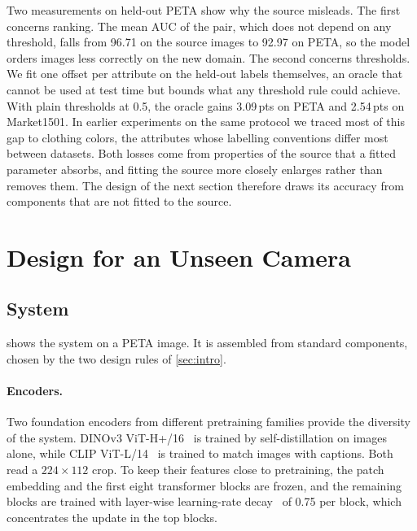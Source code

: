 \documentclass[10pt,twocolumn,letterpaper]{article}
\newcommand{\pts}{\,pts}
\begin{document}
Two measurements on held-out PETA show why the source misleads. The first concerns ranking. The mean AUC of the pair, which does not depend on any threshold, falls from 96.71 on the source images to 92.97 on PETA, so the model orders images less correctly on the new domain. The second concerns thresholds. We fit one offset per attribute on the held-out labels themselves, an oracle that cannot be used at test time but bounds what any threshold rule could achieve. With plain thresholds at 0.5, the oracle gains 3.09\pts{} on PETA and 2.54\pts{} on Market1501. In earlier experiments on the same protocol we traced most of this gap to clothing colors, the attributes whose labelling conventions differ most between datasets. Both losses come from properties of the source that a fitted parameter absorbs, and fitting the source more closely enlarges rather than removes them. The design of the next section therefore draws its accuracy from components that are not fitted to the source.

\section{Design for an Unseen Camera}
\label{sec:design}

\subsection{System}
\label{sec:system}

 shows the system on a PETA image. It is assembled from standard components, chosen by the two design rules of \cref{sec:intro}.

\paragraph{Encoders.} Two foundation encoders from different pretraining families provide the diversity of the system. DINOv3 ViT-H+/16~\cite{dinov3} is trained by self-distillation on images alone, while CLIP ViT-L/14~\cite{clip} is trained to match images with captions. Both read a $224\times112$ crop. To keep their features close to pretraining, the patch embedding and the first eight transformer blocks are frozen, and the remaining blocks are trained with layer-wise learning-rate decay~\cite{beit} of 0.75 per block, which concentrates the update in the top blocks.
\end{document}
